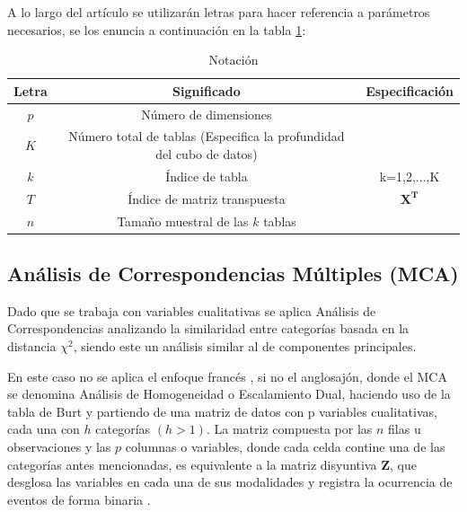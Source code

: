 \documentclass[mathematics,article,submit,moreauthors,pdftex]{mdpi}
\begin{document}
A lo largo del artículo se utilizarán letras para hacer referencia a
parámetros necesarios, se los enuncia a continuación en la tabla
\ref{tab:notacion2}:

\begin{table}[!ht]
\begin{center}
 \begin{tabular}{||c ||c | c ||} 
 \hline
 Letra &  Significado & Especificación\\
 \hline\hline
 $p$ & Número de dimensiones &\\
\hline
 $K$ & Número total de tablas (Especifica la profundidad del cubo de datos) & \\
 \hline
 $k$ & Índice de tabla &  k=1,2,...,K\\
  \hline
 $T$ & Índice de matriz transpuesta &  $\mathbf{X^{T}}$\\
\hline
 $n$ & Tamaño muestral de las $k$ tablas &\\
\hline
\end{tabular}\caption{Notación}
\label{tab:notacion2}
\end{center}
\end{table}

\hypertarget{anuxe1lisis-de-correspondencias-muxfaltiples-mca}{%
\subsection{Análisis de Correspondencias Múltiples
(MCA)}\label{anuxe1lisis-de-correspondencias-muxfaltiples-mca}}

Dado que se trabaja con variables cualitativas se aplica Análisis de
Correspondencias \citep{Benzecri} analizando la similaridad entre
categorías \citep{perez2004} basada en la distancia \(\chi^2\), siendo
este un análisis similar al de componentes principales.

En este caso no se aplica el enfoque francés \citep{michailidis1998}, si
no el anglosajón, donde el MCA se denomina Análisis de Homogeneidad o
Escalamiento Dual, haciendo uso de la tabla de Burt \citep{Benzecri} y
partiendo de una matriz de datos con p variables cualitativas, cada una
con \(h\) categorías \((h >1)\). La matriz compuesta por las \(n\) filas
u observaciones y las \(p\) columnas o variables, donde cada celda
contine una de las categorías antes mencionadas, es equivalente a la
matriz disyuntiva \textbf{Z}, que desglosa las variables en cada una de
sus modalidades y registra la ocurrencia de eventos de forma binaria
\citep{Benzecri}.
\end{document}
